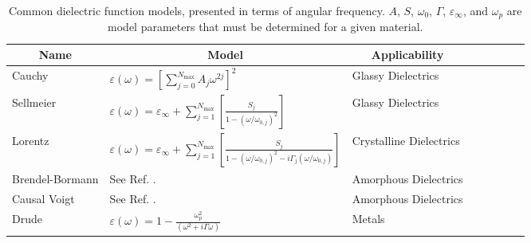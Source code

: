 \begin{table}
	\caption{\label{tab:DielectricFunctionModels}Common dielectric function models, presented in terms of angular frequency. $A$, $S$, $\omega_{0}$, $\Gamma$, $\varepsilon_{\infty}$, and $\omega_{p}$ are model parameters that must be determined for a given material.}
	\begin{center}
		\renewcommand{\arraystretch}{1.15}
		\setlength{\tabcolsep}{0.10cm}
		\begin{tabular}{llllllll}
			\hline 
			\multicolumn{1}{c}{Name} &
			\multicolumn{1}{c}{Model} & 
			\multicolumn{1}{c}{Applicability} \\
			\hline
			Cauchy & $\varepsilon(\omega) = \left[ \sum_{j=0}^{N_{\mathrm{max}}} A_{j} \omega^{2j} \right]^{2}$ & Glassy Dielectrics \\
			Sellmeier & $\varepsilon(\omega) = \varepsilon_\infty + \sum_{j=1}^{N_{\mathrm{max}}} \left[ \frac{S_{j} }{1 - ( \omega / \omega_{0,j} )^{2} } \right]$ & Glassy Dielectrics \\
			Lorentz & $\varepsilon(\omega) = \varepsilon_\infty + \sum_{j=1}^{N_{\mathrm{max}}} \left[ \frac{S_{j} }{1 - ( \omega / \omega_{0,j} )^{2} -  i \Gamma_{j} (\omega / \omega_{0,j} ) } \right]$ & Crystalline Dielectrics \\
			Brendel-Bormann & See Ref. \citenum{Brendel1992}. & Amorphous Dielectrics \\
			Causal Voigt & See Ref. \citenum{DeSousaMeneses2005}. & Amorphous Dielectrics \\
			Drude & $\varepsilon(\omega) = 1 - \frac{\omega_p^2}{\left( \omega^2 +  i \Gamma \omega \right)}$ & Metals \\
			\hline
		\end{tabular} 
	\end{center}
\end{table}


